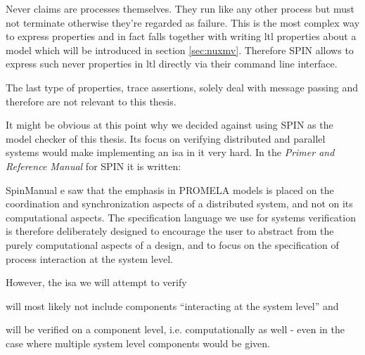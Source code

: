 Never claims are processes themselves.
They run like any other process but must not terminate otherwise they're regarded as failure.
This is the most complex way to express properties and in fact falls together with writing \gls{ltl} properties about a model which will be introduced in section \ref{sec:nuxmv}.
Therefore SPIN allows to express such never properties in \gls{ltl} directly via their command line interface.

The last type of properties, trace assertions, solely deal with message passing and therefore are not relevant to this thesis.

It might be obvious at this point why we decided against using SPIN as the model checker of this thesis.
Its focus on verifying distributed and parallel systems would make implementing an \gls{isa} in it very hard.
In the \textit{Primer and Reference Manual} for SPIN it is written:

\begin{displaycquote}[p.33]{SpinManual}
    e saw that the emphasis in PROMELA models is placed on the coordination and synchronization aspects of a distributed system, and not on its computational aspects. \textelp{}
    The specification language we use for systems verification is therefore deliberately designed to encourage the user to abstract from the purely computational aspects of a design, and to focus on the specification of process interaction at the system level.
\end{displaycquote}

However, the \gls{isa} we will attempt to verify
\begin{enumerate*}[label=\alph*)]
    \item will most likely not include components \enquote{interacting at the system level} and
    \item will be verified on a component level, i.e. computationally as well - even in the case where multiple system level components would be given.
\end{enumerate*}

